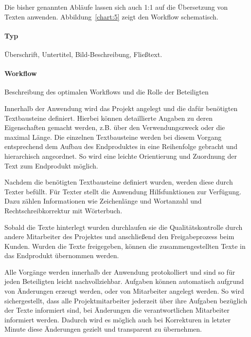 Die bisher genannten Abläufe lassen sich auch 1:1 auf die Übersetzung von Texten anwenden. Abbildung~\ref{chart:5} zeigt den Workflow schematisch.


\label{l:textattribute}

\paragraph{Typ} Überschrift, Untertitel, Bild-Beschreibung, Fließtext.

\paragraph{Workflow}

Beschreibung des optimalen Workflows und die Rolle der Beteiligten

Innerhalb der Anwendung wird das Projekt angelegt und die dafür benötigten Textbausteine definiert. Hierbei können detaillierte Angaben zu deren Eigenschaften gemacht werden, z.B. über den Verwendungszweck oder die maximal Länge. Die einzelnen Textbausteine werden bei diesem Vorgang entsprechend dem Aufbau des Endproduktes in eine Reihenfolge gebracht und hierarchisch angeordnet. So wird eine leichte Orientierung und Zuordnung der Text zum Endprodukt möglich. 

Nachdem die benötigten Textbausteine definiert wurden, werden diese durch Texter befüllt. Für Texter stellt die Anwendung Hilfsfunktionen zur Verfügung. Dazu zählen Informationen wie Zeichenlänge und Wortanzahl und Rechtschreibkorrektur mit Wörterbuch.

Sobald die Texte hinterlegt wurden durchlaufen sie die Qualitätskontrolle durch andere Mitarbeiter des Projektes und anschließend den Freigabeprozess beim Kunden. Wurden die Texte freigegeben, können die zusammengestellten Texte in das Endprodukt übernommen werden. 

Alle Vorgänge werden innerhalb der Anwendung protokolliert und sind so für jeden Beteiligten leicht nachvollziehbar. Aufgaben können automatisch aufgrund von Änderungen erzeugt werden, oder von Mitarbeiter angelegt werden. So wird sichergestellt, dass alle Projektmitarbeiter jederzeit über ihre Aufgaben bezüglich der Texte informiert sind, bei Änderungen die verantwortlichen Mitarbeiter informiert werden. Dadurch wird es möglich auch bei Korrekturen in letzter Minute diese Änderungen gezielt und transparent zu übernehmen.

